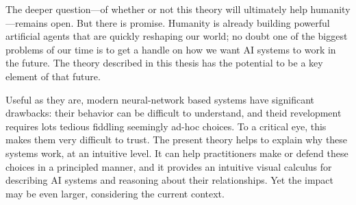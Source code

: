 %
%
%
%
%
%
The deeper question---of whether or not this theory will ultimately help humanity---remains open.
But there is promise. Humanity is already building powerful artificial agents that are quickly reshaping our world; no doubt one of the biggest problems of our time is to get a handle on how we want AI systems to work in the future.  
The theory described in this thesis has the potential to be a key element of that future.

Useful as they are, modern neural-network based systems have significant drawbacks:
their behavior can be difficult to understand, 
and theid revelopment requires lots tedious fiddling seemingly ad-hoc choices.
To a critical eye, this makes them very difficult to trust.
The present theory helps to explain why these systems work, at an intuitive level.
It can help practitioners make or defend these choices in a principled manner, and it provides an intuitive visual calculus for describing AI systems and reasoning about their relationships. 
Yet the impact may be even larger, considering the current context. 

